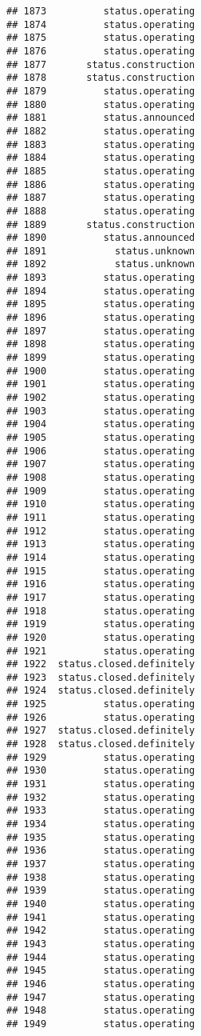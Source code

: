 \documentclass[
]{article}
\begin{document}
\begin{verbatim}
## 1873          status.operating
## 1874          status.operating
## 1875          status.operating
## 1876          status.operating
## 1877       status.construction
## 1878       status.construction
## 1879          status.operating
## 1880          status.operating
## 1881          status.announced
## 1882          status.operating
## 1883          status.operating
## 1884          status.operating
## 1885          status.operating
## 1886          status.operating
## 1887          status.operating
## 1888          status.operating
## 1889       status.construction
## 1890          status.announced
## 1891            status.unknown
## 1892            status.unknown
## 1893          status.operating
## 1894          status.operating
## 1895          status.operating
## 1896          status.operating
## 1897          status.operating
## 1898          status.operating
## 1899          status.operating
## 1900          status.operating
## 1901          status.operating
## 1902          status.operating
## 1903          status.operating
## 1904          status.operating
## 1905          status.operating
## 1906          status.operating
## 1907          status.operating
## 1908          status.operating
## 1909          status.operating
## 1910          status.operating
## 1911          status.operating
## 1912          status.operating
## 1913          status.operating
## 1914          status.operating
## 1915          status.operating
## 1916          status.operating
## 1917          status.operating
## 1918          status.operating
## 1919          status.operating
## 1920          status.operating
## 1921          status.operating
## 1922  status.closed.definitely
## 1923  status.closed.definitely
## 1924  status.closed.definitely
## 1925          status.operating
## 1926          status.operating
## 1927  status.closed.definitely
## 1928  status.closed.definitely
## 1929          status.operating
## 1930          status.operating
## 1931          status.operating
## 1932          status.operating
## 1933          status.operating
## 1934          status.operating
## 1935          status.operating
## 1936          status.operating
## 1937          status.operating
## 1938          status.operating
## 1939          status.operating
## 1940          status.operating
## 1941          status.operating
## 1942          status.operating
## 1943          status.operating
## 1944          status.operating
## 1945          status.operating
## 1946          status.operating
## 1947          status.operating
## 1948          status.operating
## 1949          status.operating

\end{verbatim}
\end{document}
